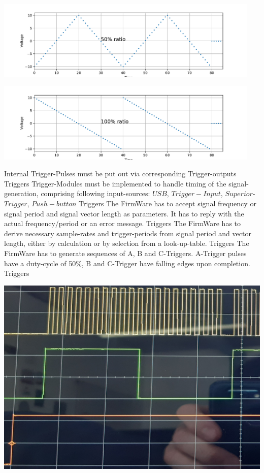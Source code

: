 		\begin{center}
		\includegraphics[width=0.95\textwidth]{src/_rampAssymetry50perc.pdf}
		\end{center}
		\begin{center}
		\includegraphics[width=0.95\textwidth]{src/_rampAssymetry100perc.pdf}
		\end{center}


	{ Internal Trigger-Pulses must be put out via corresponding Trigger-outputs }
	{}{}{}{Triggers}
	{ Trigger-Modules must be implemented to handle timing of the signal-generation, comprising following input-sources:  $USB$, $Trigger-Input$, $Superior$-$Trigger$, $Push-button$ }
	{}{}{}{Triggers}
	{ The FirmWare has to accept signal frequency or signal period and signal vector length as parameters. It has to reply with the actual frequency/period or an error message.}
	{}{}{}{Triggers}
	{ The FirmWare has to derive necessary sample-rates and trigger-periods from signal period and vector length, either by calculation or by selection from a look-up-table.}
	{}{}{}{Triggers}
	{ The FirmWare has to generate sequences of A, B and C-Triggers. A-Trigger pulses have a duty-cycle of 50\%, B and C-Trigger have falling edges upon completion.}
	{}{}{}{Triggers}
		\begin{center}
		\includegraphics[height=0.2\textheight]{src/_TrigSequence.jpg}
		\end{center}



